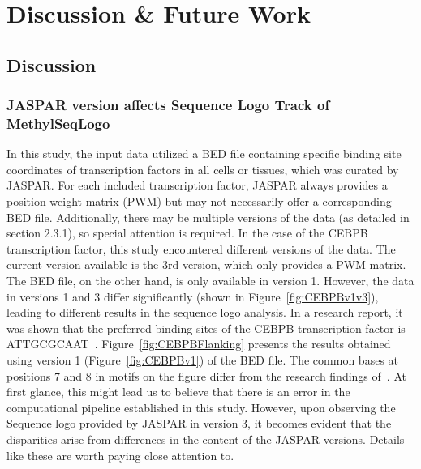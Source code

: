 \documentclass{PHlab-thesis}
\begin{document}
\chapter{Discussion \& Future Work}
\section{Discussion}
\subsection{JASPAR version affects Sequence Logo Track of MethylSeqLogo}
In this study, the input data utilized a BED file containing specific binding site coordinates of transcription factors in all cells or tissues, which was curated by JASPAR. For each included transcription factor, JASPAR always provides a position weight matrix (PWM) but may not necessarily offer a corresponding BED file. Additionally, there may be multiple versions of the data (as detailed in section 2.3.1), so special attention is required. In the case of the CEBPB transcription factor, this study encountered different versions of the data. The current version available is the 3rd version, which only provides a PWM matrix. The BED file, on the other hand, is only available in version 1. However, the data in versions 1 and 3 differ significantly (shown in Figure~\ref{fig:CEBPBv1v3}), leading to different results in the sequence logo analysis. In a research report, it was shown that the preferred binding sites of the CEBPB transcription factor is ATTGCGCAAT~\cite{johnson1993identification}. Figure~\ref{fig:CEBPBFlanking} presents the results obtained using version 1 (Figure~\ref{fig:CEBPBv1}) of the BED file. The common bases at positions 7 and 8 in motifs on the figure differ from the research findings of~\cite{johnson1993identification}. At first glance, this might lead us to believe that there is an error in the computational pipeline established in this study. However, upon observing the Sequence logo provided by JASPAR in version 3, it becomes evident that the disparities arise from differences in the content of the JASPAR versions. Details like these are worth paying close attention to.
\
\end{document}
